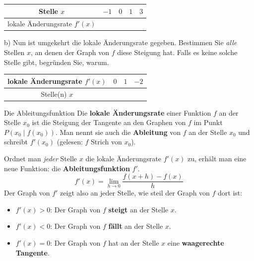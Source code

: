 \documentclass[11pt, a4paper, oneside]{article}
\begin{document}
    \begin{center}
        \begin{tabularx}{.8\textwidth}{|c|X|X|X|X|}
            \hline
            Stelle $x$ & \centering $-1$ & \centering $0$ & \centering $1$ & \centering\arraybackslash $3$\\
            \hline
            lokale Änderungsrate $f'(x)$ & & & & \\
            \hline
        \end{tabularx}
    \end{center}

    b) Nun ist umgekehrt die lokale Änderungsrate gegeben.
    Bestimmen Sie \textit{alle} Stellen $x$, an denen der Graph von $f$ diese Steigung hat.
    Falls es keine solche Stelle gibt, begründen Sie, warum.

    \begin{center}
        \begin{tabularx}{.8\textwidth}{|c|X|X|X|}
            \hline
            lokale Änderungsrate $f'(x)$ & \centering $0$ & \centering $1$ & \centering\arraybackslash $-2$\\
            \hline
            Stelle(n) $x$ & & & \\
            \hline
        \end{tabularx}
    \end{center}

    \checkered[2.5cm]


    \begin{warning}{Die Ableitungsfunktion}
        Die \textbf{lokale Änderungsrate} einer Funktion $f$ an der Stelle $x_0$ ist die Steigung der Tangente an den Graphen von $f$ im Punkt $P(x_0 \mid f(x_0))$.
        Man nennt sie auch die \textbf{Ableitung} von $f$ an der Stelle $x_0$ und schreibt $f'(x_0)$ (gelesen: \glqq $f$ Strich von $x_0$\grqq).

        Ordnet man \textit{jeder} Stelle $x$ die lokale Änderungsrate $f'(x)$ zu, erhält man eine neue Funktion: die \textbf{Ableitungsfunktion} $f'$.
        \[
            f'(x) = \lim_{h \to 0} \frac{f(x+h)-f(x)}{h}
        \]
        Der Graph von $f'$ zeigt also an jeder Stelle, wie steil der Graph von $f$ dort ist:
        \begin{itemize}
            \item $f'(x) > 0$: Der Graph von $f$ \textbf{steigt} an der Stelle $x$.
            \item $f'(x) < 0$: Der Graph von $f$ \textbf{fällt} an der Stelle $x$.
            \item $f'(x) = 0$: Der Graph von $f$ hat an der Stelle $x$ eine \textbf{waagerechte Tangente}.
        \end{itemize}
    \end{warning}
\end{document}
